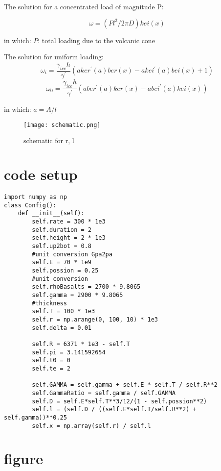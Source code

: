 \documentclass{article}
\begin{document}
The solution for a concentrated load of magnitude P:\newline

\begin{equation}\label{volcano}
\omega=(Pl^2/2\pi D)kei(x)
\end{equation}

in which:\newline
$P$: total loading due to the volcanic cone\newline

The solution for uniform loading:\newline
\begin{equation}
  \omega_i=\frac{\gamma_{ice}h}{\gamma^{'}}(aker^{'}(a)ber(x)-akei^{'}(a)bei(x)+1)
\end{equation}
\begin{equation}
  \omega_0=\frac{\gamma_{ice}h}{\gamma^{'}}(aber^{'}(a)ker(x)-abei^{'}(a)kei(x))
\end{equation}


in which:\newline
$a=A/l$\newline

\begin{figure}[H]
\centering
\texttt{[image: schematic.png]}
\caption{schematic for r, l}
\end{figure}


\section{code setup}
\begin{lstlisting}
import numpy as np
class Config():
	def __init__(self):
		self.rate = 300 * 1e3
		self.duration = 2
		self.height = 2 * 1e3
		self.up2bot = 0.8
		#unit conversion Gpa2pa
		self.E = 70 * 1e9
		self.possion = 0.25
		#unit conversion
		self.rhoBasalts = 2700 * 9.8065
		self.gamma = 2900 * 9.8065
		#thickness
		self.T = 100 * 1e3
		self.r = np.arange(0, 100, 10) * 1e3
		self.delta = 0.01

		self.R = 6371 * 1e3 - self.T
		self.pi = 3.141592654
		self.t0 = 0
		self.te = 2

		self.GAMMA = self.gamma + self.E * self.T / self.R**2
		self.GammaRatio = self.gamma / self.GAMMA
		self.D = self.E*self.T**3/12/(1 - self.possion**2)
		self.l = (self.D / ((self.E*self.T/self.R**2) + self.gamma))**0.25
		self.x = np.array(self.r) / self.l

		\end{lstlisting}
\section{figure}
\end{document}
